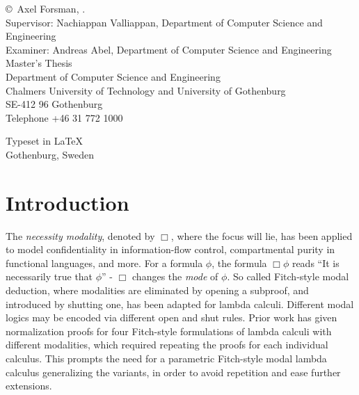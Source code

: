 \documentclass[12pt,twoside,openright]{report}
\numberwithin{equation}{chapter}
\numberwithin{figure}{chapter}
\numberwithin{table}{chapter}
\theoremstyle{definition}\newtheorem{definition}{Definition}
\begin{document}
\copyright~Axel Forsman, \the\year. \\[1cm]

Supervisor: Nachiappan Valliappan, Department of Computer Science and Engineering \\
Examiner: Andreas Abel, Department of Computer Science and Engineering \\[1cm]

Master's Thesis \the\year \\
Department of Computer Science and Engineering \\
Chalmers University of Technology and University of Gothenburg \\
SE-412 96 Gothenburg \\
Telephone +46 31 772 1000 \\[0.5cm]

\vfill

Typeset in \LaTeX \\
Gothenburg, Sweden \the\year

\newpage
\tableofcontents

\cleardoublepage
{}
{}
\listoffigures

\cleardoublepage
\setcounter{page}{1}

\chapter{Introduction}

The \emph{necessity modality}, denoted by $\Box$, where the focus will lie,
has been applied to model confidentiality in information-flow control,
compartmental purity in functional languages,
and more.
For a formula $\phi$, the formula $\Box \phi$ reads
``It is necessarily true that $\phi$'' -
$\Box$ changes the \emph{mode} of $\phi$.
So called Fitch-style modal deduction,
where modalities are eliminated by opening a subproof,
and introduced by shutting one,
has been adapted for lambda calculi.
Different modal logics may be encoded via different open and shut rules.
Prior work \cite{valliappan22} has given normalization proofs
for four Fitch-style formulations of lambda calculi with different modalities,
which required repeating the proofs for each individual calculus.
This prompts the need for a parametric Fitch-style modal lambda calculus
generalizing the variants,
in order to avoid repetition and ease further extensions.
\end{document}

